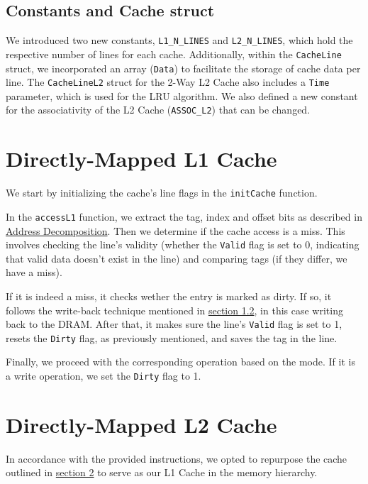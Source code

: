 \documentclass[12pt]{article}
\begin{document}
    \subsection{Constants and Cache struct}
    We introduced two new constants, \texttt{L1\_N\_LINES} and \texttt{L2\_N\_LINES}, which hold the respective number of lines for each cache.
    Additionally, within the \texttt{CacheLine} struct, we incorporated an array (\texttt{Data}) to facilitate the storage of cache data per line.
    The \texttt{CacheLineL2} struct for the 2-Way L2 Cache also includes a \texttt{Time} parameter, which is used for the LRU algorithm.
    We also defined a new constant for the associativity of the L2 Cache (\texttt{ASSOC\_L2}) that can be changed.

    \section{Directly-Mapped L1 Cache} \label{S2}

    We start by initializing the cache's line flags in the \texttt{initCache} function.

    In the \texttt{accessL1} function, we extract the tag, index and offset bits as described in \hyperref[AD]{Address Decomposition}. Then we determine if the
    cache access is a miss. This involves checking the line's validity (whether the \texttt{Valid} flag is set to 0, indicating that valid data doesn't exist in the line)
    and comparing tags (if they differ, we have a miss).

    If it is indeed a miss, it checks wether the entry is marked as dirty. If so, it follows the write-back technique mentioned in \hyperref[WBP]{section 1.2}, in
    this case writing back to the DRAM. After that, it makes sure the line's \texttt{Valid} flag is set to 1, resets the \texttt{Dirty} flag, as previously mentioned, and saves
    the tag in the line.

    Finally, we proceed with the corresponding operation based on the mode. If it is a write operation, we set the \texttt{Dirty} flag to 1.

    \section{Directly-Mapped L2 Cache} \label{S3}

    In accordance with the provided instructions, we opted to repurpose the cache outlined in \hyperref[S2]{section 2} to serve as our L1 Cache in the memory hierarchy.
\end{document}
